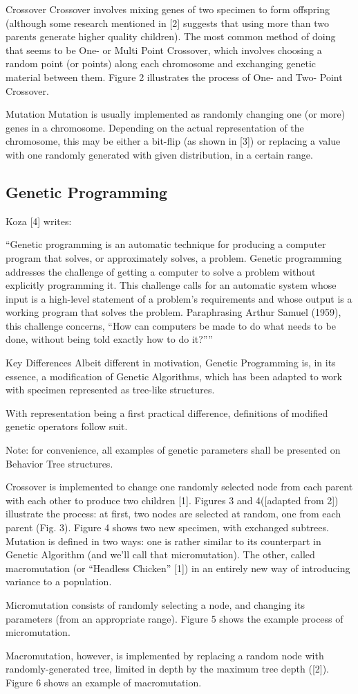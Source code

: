 Crossover Crossover involves mixing genes of two specimen to form offspring (although some research mentioned in [2] suggests that using more than two parents generate higher quality children). The most common method of doing that seems to be One- or Multi Point Crossover, which involves choosing a random point (or points) along each chromosome and exchanging genetic material between them. Figure 2 illustrates the process of One- and Two- Point Crossover.

Mutation Mutation is usually implemented as randomly changing one (or more) genes in a chromosome. Depending on the actual representation of the chromosome, this may be either a bit-flip (as shown in [3]) or replacing a value with one randomly generated with given distribution, in a certain range.
\subsection{Genetic Programming}
Koza [4] writes: %

``Genetic programming is an automatic technique for producing a computer program that solves, or approximately solves, a problem. Genetic programming addresses the challenge of getting a computer to solve a problem without explicitly programming it. This challenge calls for an automatic system whose input is a high-level statement of a problem’s requirements and whose output is a working program that solves the problem. Paraphrasing Arthur Samuel (1959), this challenge concerns, ``How can computers be made to do what needs to be done, without being told exactly how to do it?''''

Key Differences
Albeit different in motivation, Genetic Programming is, in its essence, a modification of Genetic Algorithms, which has been adapted to work with specimen represented as tree-like structures.

With representation being a first practical difference, definitions of modified genetic operators follow suit.

Note: for convenience, all examples of genetic parameters shall be presented on Behavior Tree structures.

Crossover is implemented to change one randomly selected node from each parent with each other to produce two children [1]. Figures 3 and 4([adapted from 2]) illustrate the process: at first, two nodes are selected at random, one from each parent (Fig. 3). Figure 4 shows two new specimen, with exchanged subtrees.
Mutation is defined in two ways: one is rather similar to its counterpart in Genetic Algorithm (and we’ll call that micromutation). The other, called macromutation (or ``Headless Chicken'' [1]) in an entirely new way of introducing variance to a population.

Micromutation consists of randomly selecting a node, and changing its parameters (from an appropriate range). Figure 5 shows the example process of micromutation.

Macromutation, however, is implemented by replacing a random node with randomly-generated tree, limited in depth by the maximum tree depth ([2]). Figure 6 shows an example of macromutation.

